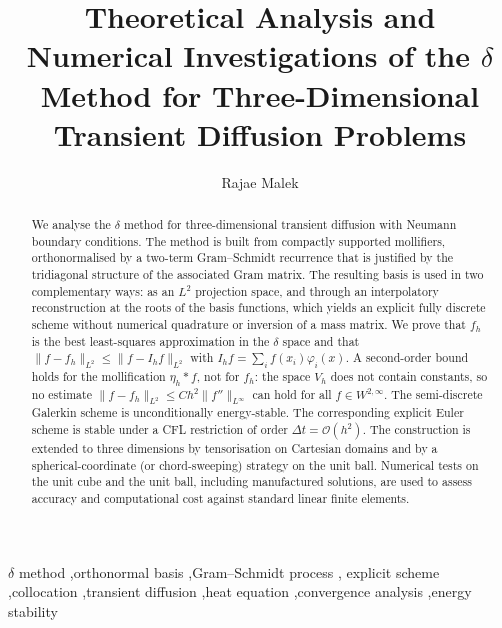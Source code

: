 \documentclass[final,3p,times]{elsarticle}
\theoremstyle{plain}
\theoremstyle{definition}
\theoremstyle{remark}
\newcommand{\dziti}{\ensuremath{\delta}\text{-Ziti}}
\begin{document}
\begin{frontmatter}

\title{Theoretical Analysis and Numerical Investigations of the \dziti{} Method
for Three-Dimensional Transient Diffusion Problems}

\author{Rajae Malek}

\begin{abstract}
We analyse the \dziti{} method for three-dimensional transient diffusion with
Neumann boundary conditions. The method is built from compactly supported
mollifiers, orthonormalised by a two-term Gram--Schmidt recurrence that is
justified by the tridiagonal structure of the associated Gram matrix. The
resulting basis is used in two complementary ways: as an $L^2$ projection
space, and through an interpolatory reconstruction at the roots of the basis
functions, which yields an explicit fully discrete scheme without numerical
quadrature or inversion of a mass matrix. We prove that $f_h$ is the best least-squares approximation in the
\dziti{} space and that $\lVert f-f_h\rVert_{L^2}\le\lVert f-I_h f\rVert_{L^2}$
with $I_h f=\sum_i f(x_i)\varphi_i(x)$. A second-order bound holds for the
mollification $\eta_h*f$, not for $f_h$: the space $V_h$ does not contain
constants, so no estimate $\lVert f-f_h\rVert_{L^2}\le C h^2\lVert f''\rVert_{L^\infty}$
can hold for all $f\in W^{2,\infty}$. The semi-discrete Galerkin scheme is unconditionally
energy-stable. The corresponding explicit Euler scheme is
stable under a CFL restriction of order $\Delta t=\mathcal{O}(h^2)$. The
construction is extended to three dimensions by tensorisation on Cartesian
domains and by a spherical-coordinate (or chord-sweeping) strategy on the unit
ball. Numerical tests on the unit cube and the unit ball, including
manufactured solutions, are used to assess accuracy and computational cost
against standard linear finite elements.
\end{abstract}

\begin{keyword}
\dziti{} method \sep orthonormal basis \sep Gram--Schmidt process \sep
explicit scheme \sep collocation \sep transient diffusion \sep heat equation
\sep convergence analysis \sep energy stability
\end{keyword}

\end{frontmatter}
\end{document}
